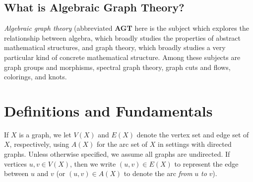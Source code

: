 \renewcommand{\exc}[1]{\subsubsection*{Exercise 1.#1}}



\subsection*{What is Algebraic Graph Theory?}

\textit{Algebraic graph theory} (abbreviated \textbf{AGT} here is the subject which explores the relationship between algebra, which broadly studies the properties of abstract mathematical structures, and graph theory, which broadly studies a very particular kind of concrete mathematical structure.  Among these subjects are graph groups and morphisms, spectral graph theory, graph cuts and flows, colorings, and knots.






\section*{Definitions and Fundamentals}

If $X$ is a graph, we let $V(X)$ and $E(X)$ denote the vertex set and edge set of $X$, respectively, using $A(X)$ for the arc set of $X$ in settings with directed graphs.  Unless otherwise specified, we assume all graphs are undirected.  If vertices $u,v\in V(X)$, then we write $(u,v)\in E(X)$ to represent the edge between $u$ and $v$ (or $(u,v)\in A(X)$ to denote the arc \textit{from} $u$ \textit{to} $v$).




